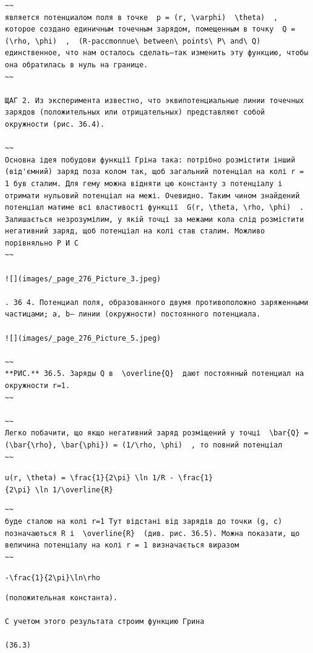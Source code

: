 \documentclass[
  ukrainian,
]{article}
\begin{document}
\begin{verbatim}
~~
является потенциалом поля в точке  p = (r, \varphi)  \theta)  , которое создано единичным точечным зарядом, помещенным в точку  Q = (\rho, \phi)  ,  (R-paccmonnue\ between\ points\ P\ and\ Q)  единственное, что нам осталось сделать—так изменить эту функцию, чтобы она обратилась в нуль на границе.
~~

ЩАГ 2. Из эксперимента известно, что эквипотенциальные линии точечных зарядов (положительных или отрицательных) представляют собой окружности (рис. 36.4).

~~
Основна ідея побудови функції Гріна така: потрібно розмістити інший (від'ємний) заряд поза колом так, щоб загальний потенціал на колі r = 1 був сталим. Для гему можна відняти цю константу з потенціалу і отримати нульовий потенціал на межі. Очевидно. Таким чином знайдений потенціал матиме всі властивості функції  G(r, \theta, \rho, \phi)  . Залишається незрозумілим, у якій точці за межами кола слід розмістити негативний заряд, щоб потенціал на колі став сталим. Можливо порівняльно P И С
~~

![](images/_page_276_Picture_3.jpeg)

. 36 4. Потенциал поля, образованного двумя противоположно заряженными частицами; a, b— линии (окружности) постоянного потенциала.

![](images/_page_276_Picture_5.jpeg)

~~
**РИС.** 36.5. Заряды Q в  \overline{Q}  дают постоянный потенциал на окружности r=1.
~~

~~
Легко побачити, що якщо негативний заряд розміщений у точці  \bar{Q} = (\bar{\rho}, \bar{\phi}) = (1/\rho, \phi)  , то повний потенціал
~~
\end{verbatim}

\texttt{u(r,\ \textbackslash{}theta)\ =\ \textbackslash{}frac\{1\}\{2\textbackslash{}pi\}\ \textbackslash{}ln\ 1/R\ -\ \textbackslash{}frac\{1\}\{2\textbackslash{}pi\}\ \textbackslash{}ln\ 1/\textbackslash{}overline\{R\}}

\begin{verbatim}
~~
буде сталою на колі r=1 Тут відстані від зарядів до точки (g, c) позначаються R і  \overline{R}  (див. рис. 36.5). Можна показати, що величина потенціалу на колі r = 1 визначається виразом
~~
\end{verbatim}

\texttt{-\textbackslash{}frac\{1\}\{2\textbackslash{}pi\}\textbackslash{}ln\textbackslash{}rho}

\begin{verbatim}
(положительная константа).

С учетом этого результата строим функцию Грина

(36.3)
\end{verbatim}
\end{document}
